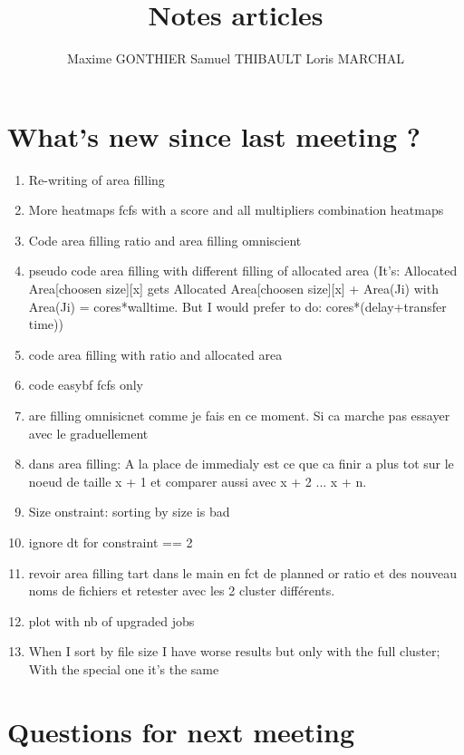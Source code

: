 \documentclass[a4paper]{article}
\title{Notes articles}
\author{Maxime GONTHIER Samuel THIBAULT Loris MARCHAL}
\begin{document}
\newpage


\section{What's new since last meeting ?}

	\begin{enumerate}
		\item Re-writing of area filling
		\item More heatmaps fcfs with a score and all multipliers combination heatmaps
		\item Code area filling ratio and area filling omniscient
		\item pseudo code area filling with different filling of allocated area (It's: Allocated Area[choosen size][x] gets Allocated Area[choosen size][x] + Area(Ji) with Area(Ji) = cores*walltime. But I would prefer to do: cores*(delay+transfer time))
		\item code area filling with ratio and allocated area
		\item code easybf fcfs only
		\item are filling omnisicnet comme je fais en ce moment. Si ca marche pas essayer avec le graduellement
		\item dans area filling: A la place de immedialy est ce que ca finir a plus tot sur le noeud de taille x + 1 et comparer aussi avec x + 2 ... x + n.
		\item Size onstraint: sorting by size is bad
		\item ignore dt for constraint == 2
		\item revoir area filling tart dans le main en fct de planned or ratio et des nouveau noms de fichiers et retester avec les 2 cluster différents.
		\item plot with nb of upgraded jobs
		\item When I sort by file size I have worse results but only with the full cluster; With the special one it's the same
	\end{enumerate}
	
\section{Questions for next meeting}
\end{document}
